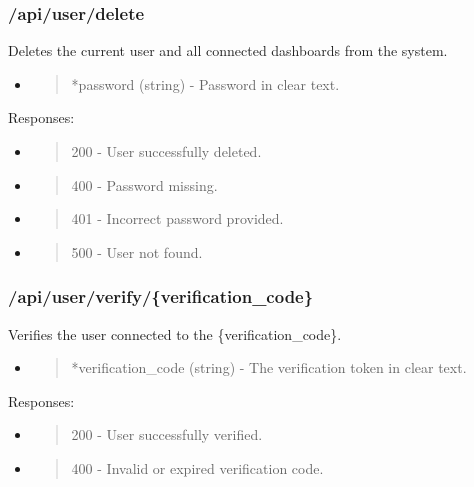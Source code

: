\hypertarget{apiuserdelete}{%
\subsubsection{/api/user/delete}\label{apiuserdelete}}

Deletes the current user and all connected dashboards from the system.

\begin{itemize}
\item
  \begin{quote}
  *password (string) - Password in clear text.
  \end{quote}
\end{itemize}

Responses:

\begin{itemize}
\item
  \begin{quote}
  200 - User successfully deleted.
  \end{quote}
\item
  \begin{quote}
  400 - Password missing.
  \end{quote}
\item
  \begin{quote}
  401 - Incorrect password provided.
  \end{quote}
\item
  \begin{quote}
  500 - User not found.
  \end{quote}
\end{itemize}

\hypertarget{apiuserverifyverification_code}{%
\subsubsection{/api/user/verify/\{verification\_code\}}\label{apiuserverifyverification_code}}

Verifies the user connected to the \{verification\_code\}.

\begin{itemize}
\item
  \begin{quote}
  *verification\_code (string) - The verification token in clear text.
  \end{quote}
\end{itemize}

Responses:

\begin{itemize}
\item
  \begin{quote}
  200 - User successfully verified.
  \end{quote}
\item
  \begin{quote}
  400 - Invalid or expired verification code.
  \end{quote}
\end{itemize}

